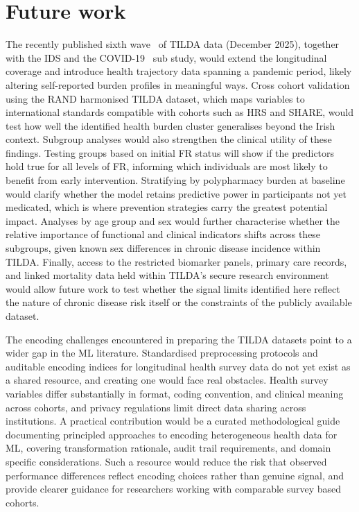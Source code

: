 \section{Future work}\label{sc:future_work}
The recently published sixth wave~\cite{ISSDA/RWNE1A_2025} of \gls{TILDA} data (December 2025), together with the \gls{IDS} and the COVID-19~\cite{ISSDA/A8YGJ5_2025} sub study, would extend the longitudinal coverage and introduce health trajectory data spanning a pandemic period, likely altering self-reported burden profiles in meaningful ways. Cross cohort validation using the \gls{RAND} harmonised \gls{TILDA} dataset, which maps variables to international standards compatible with cohorts such as \gls{HRS} and \gls{SHARE}, would test how well the identified health burden cluster generalises beyond the Irish context. Subgroup analyses would also strengthen the clinical utility of these findings. Testing groups based on initial \gls{FR} status will show if the predictors hold true for all levels of \gls{FR}, informing which individuals are most likely to benefit from early intervention. Stratifying by polypharmacy burden at baseline would clarify whether the model retains predictive power in participants not yet medicated, which is where prevention strategies carry the greatest potential impact. Analyses by age group and sex would further characterise whether the relative importance of functional and clinical indicators shifts across these subgroups, given known sex differences in chronic disease incidence within \gls{TILDA}. Finally, access to the restricted biomarker panels, primary care records, and linked mortality data held within \gls{TILDA}'s secure research environment would allow future work to test whether the signal limits identified here reflect the nature of chronic disease risk itself or the constraints of the publicly available dataset.

The encoding challenges encountered in preparing the \gls{TILDA} datasets point to a wider gap in the \gls{ML} literature. Standardised preprocessing protocols and auditable encoding indices for longitudinal health survey data do not yet exist as a shared resource, and creating one would face real obstacles. Health survey variables differ substantially in format, coding convention, and clinical meaning across cohorts, and privacy regulations limit direct data sharing across institutions. A practical contribution would be a curated methodological guide documenting principled approaches to encoding heterogeneous health data for \gls{ML}, covering transformation rationale, audit trail requirements, and domain specific considerations. Such a resource would reduce the risk that observed performance differences reflect encoding choices rather than genuine signal, and provide clearer guidance for researchers working with comparable survey based cohorts.


